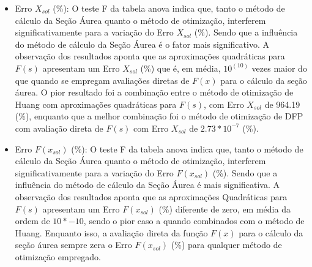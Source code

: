\begin{itemize}
        \item {Erro $X_{sol}$ (\%):} O teste F da tabela anova indica que, tanto o método de cálculo da Seção Áurea quanto o método de otimização, interferem significativamente para a variação do Erro $X_{sol}$ (\%). Sendo que a influência do método de cálculo da Seção Áurea é o fator mais significativo. A observação dos resultados aponta que as aproximações quadráticas para $F(s)$ apresentam um Erro $X_{sol}$ (\%) que é, em média, $10^(10)$ vezes maior do que quando se empregam avaliações diretas de $F(x)$ para o cálculo da seção áurea. O pior resultado foi a combinação entre o método de otimização de Huang com aproximações quadráticas para $F(s)$, com Erro $X_{sol}$ de 964.19 (\%), enquanto que a melhor combinação foi o método de otimização de DFP com avaliação direta de $F(s)$ com Erro $X_{sol}$ de $2.73*10^{-7}$ (\%).  
        \item {Erro $F(x_{sol})$ (\%):} O teste F da tabela anova indica que, tanto o método de cálculo da Seção Áurea quanto o método de otimização, interferem significativamente para a variação do Erro $F(x_{sol})$ (\%). Sendo que a influência do método de cálculo da Seção Áurea é mais significativa. A observação dos resultados aponta que as aproximações Quadráticas para $F(s)$ apresentam um Erro $F(x_{sol})$ (\%) diferente de zero, em média da ordem de $10*{-10}$, sendo o pior caso a quando combinados com o método de Huang. Enquanto isso, a avaliação direta da função $F(x)$ para o cálculo da seção áurea sempre zera o Erro $F(x_{sol})$ (\%) para qualquer método de otimização empregado.
    \end{itemize}
   